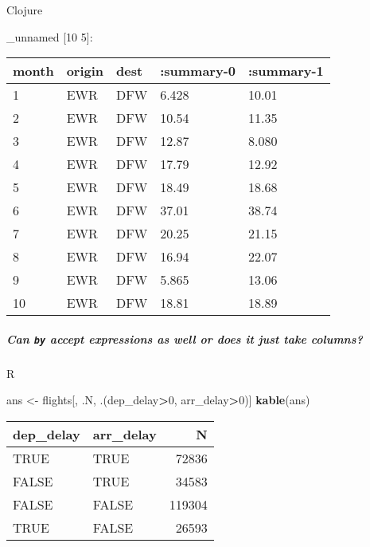 \documentclass[]{article}
\newenvironment{Shaded}{\begin{snugshade}}{\end{snugshade}}
\newcommand{\KeywordTok}[1]{\textcolor[rgb]{0.13,0.29,0.53}{\textbf{#1}}}
\newcommand{\DecValTok}[1]{\textcolor[rgb]{0.00,0.00,0.81}{#1}}
\newcommand{\StringTok}[1]{\textcolor[rgb]{0.31,0.60,0.02}{#1}}
\newcommand{\VariableTok}[1]{\textcolor[rgb]{0.00,0.00,0.00}{#1}}
\newcommand{\OperatorTok}[1]{\textcolor[rgb]{0.81,0.36,0.00}{\textbf{#1}}}
\newcommand{\NormalTok}[1]{#1}
\let\oldsubparagraph\subparagraph
\renewcommand{\subparagraph}[1]{\oldsubparagraph{#1}\mbox{}}
\begin{document}
Clojure

\begin{Shaded}
\end{Shaded}

\_unnamed {[}10 5{]}:

\begin{longtable}[]{@{}lllll@{}}
\toprule
month & origin & dest & :summary-0 & :summary-1\tabularnewline
\midrule
\endhead
1 & EWR & DFW & 6.428 & 10.01\tabularnewline
2 & EWR & DFW & 10.54 & 11.35\tabularnewline
3 & EWR & DFW & 12.87 & 8.080\tabularnewline
4 & EWR & DFW & 17.79 & 12.92\tabularnewline
5 & EWR & DFW & 18.49 & 18.68\tabularnewline
6 & EWR & DFW & 37.01 & 38.74\tabularnewline
7 & EWR & DFW & 20.25 & 21.15\tabularnewline
8 & EWR & DFW & 16.94 & 22.07\tabularnewline
9 & EWR & DFW & 5.865 & 13.06\tabularnewline
10 & EWR & DFW & 18.81 & 18.89\tabularnewline
\bottomrule
\end{longtable}

\subparagraph{\texorpdfstring{Can \texttt{by} accept expressions as well
or does it just take
columns?}{Can by accept expressions as well or does it just take columns?}}\label{can-by-accept-expressions-as-well-or-does-it-just-take-columns}

R

\begin{Shaded}
\begin{Highlighting}[]
\NormalTok{ans <-}\StringTok{ }\NormalTok{flights[, .N, .(dep_delay}\OperatorTok{>}\DecValTok{0}\NormalTok{, arr_delay}\OperatorTok{>}\DecValTok{0}\NormalTok{)]}
\KeywordTok{kable}\NormalTok{(ans)}
\end{Highlighting}
\end{Shaded}

\begin{longtable}[]{@{}llr@{}}
\toprule
dep\_delay & arr\_delay & N\tabularnewline
\midrule
\endhead
TRUE & TRUE & 72836\tabularnewline
FALSE & TRUE & 34583\tabularnewline
FALSE & FALSE & 119304\tabularnewline
TRUE & FALSE & 26593\tabularnewline
\bottomrule
\end{longtable}
\end{document}
